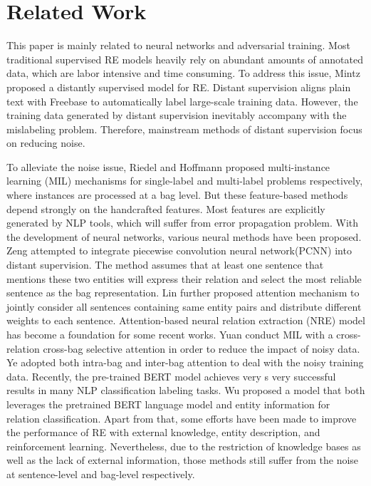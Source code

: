 \documentclass[conference]{IEEEtran}
\begin{document}
\section{Related Work}
This paper is mainly related to neural networks and adversarial training.
Most traditional supervised RE models \cite{socher2012semantic, zeng2014relation, santos2015classifying} heavily rely on abundant amounts of annotated data, which are labor intensive and time consuming.
To address this issue, Mintz\cite{mintz2009distant} proposed a distantly supervised model for RE.
Distant supervision aligns plain text with Freebase to automatically label large-scale training data.
However, the training data generated by distant supervision inevitably accompany with the mislabeling problem.
Therefore, mainstream methods of distant supervision focus on reducing noise.

To alleviate the noise issue, Riedel\cite{riedel2010modeling} and Hoffmann\cite{hoffmann2011knowledge} proposed multi-instance learning (MIL) mechanisms for single-label and multi-label problems respectively, where instances are processed at a bag level.
But these feature-based methods depend strongly on the handcrafted features.
Most features are explicitly generated by NLP tools, which will suffer from error propagation problem.
With the development of neural networks, various neural methods have been proposed.
Zeng\cite{zeng2015distant} attempted to integrate piecewise convolution neural network(PCNN) into distant supervision.
The method assumes that at least one sentence that mentions these two entities will express their relation and select the most reliable sentence as the bag representation.
Lin\cite{lin2016neural} further proposed attention mechanism to jointly consider all sentences containing same entity pairs and distribute different weights to each sentence.
Attention-based neural relation extraction (NRE) model has become a foundation for some recent works\cite{liu2017soft, ZHOU2018240}.
Yuan\cite{yuan2018crossrelation} conduct MIL with a cross-relation cross-bag selective attention in order to reduce the impact of noisy data.
Ye\cite{ye-ling-2019-distant} adopted both intra-bag and inter-bag attention to deal with the noisy training data.
Recently, the pre-trained BERT model achieves very s very successful results in many NLP classification labeling tasks.
Wu\cite{DBLP:journals/corr/abs-1905-08284} proposed a model that both leverages the pretrained BERT language model and entity information for relation classification.
Apart from that, some efforts have been made to improve the performance of RE with external knowledge, entity description, and reinforcement learning\cite{han2018neural, ji2017, feng2018reinforcement}.
Nevertheless, due to the restriction of knowledge bases as well as the lack of external information, those methods still suffer from the noise at sentence-level and bag-level respectively.
\end{document}
